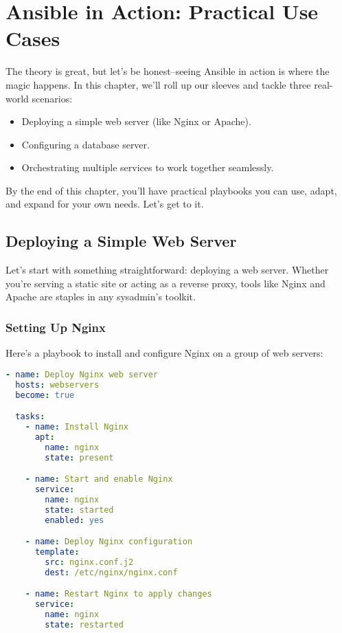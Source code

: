 \chapter{Ansible in Action: Practical Use Cases}

The theory is great, but let's be honest--seeing Ansible in action is where the magic happens. In this chapter, we'll roll up our sleeves and tackle three real-world scenarios:
\begin{itemize}
    \item Deploying a simple web server (like Nginx or Apache).
    \item Configuring a database server.
    \item Orchestrating multiple services to work together seamlessly.
\end{itemize}

By the end of this chapter, you'll have practical playbooks you can use, adapt, and expand for your own needs. Let's get to it.


\section{Deploying a Simple Web Server}

Let's start with something straightforward: deploying a web server. Whether you're serving a static site or acting as a reverse proxy, tools like Nginx and Apache are staples in any sysadmin's toolkit.

\subsection{Setting Up Nginx}

Here's a playbook to install and configure Nginx on a group of web servers:
\begin{lstlisting}[language=yaml, caption=Playbook for Nginx Deployment]
- name: Deploy Nginx web server
  hosts: webservers
  become: true

  tasks:
    - name: Install Nginx
      apt:
        name: nginx
        state: present

    - name: Start and enable Nginx
      service:
        name: nginx
        state: started
        enabled: yes

    - name: Deploy Nginx configuration
      template:
        src: nginx.conf.j2
        dest: /etc/nginx/nginx.conf

    - name: Restart Nginx to apply changes
      service:
        name: nginx
        state: restarted
\end{lstlisting}

